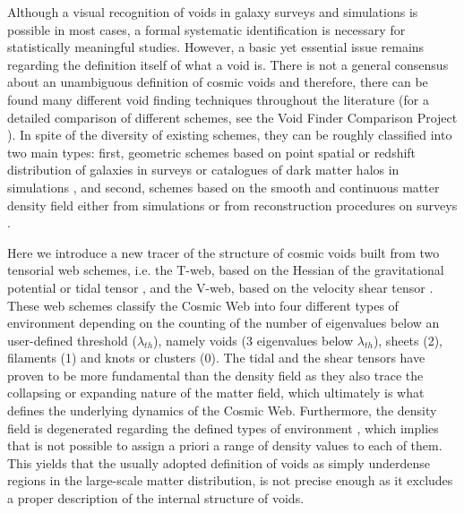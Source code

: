 \documentclass[a4,useAMS,usenatbib,usegraphicx]{latex/mn2e}
\begin{document}
Although a visual recognition of voids in galaxy surveys and simulations
is possible in most cases, a formal systematic identification is necessary 
for statistically meaningful studies. However, a basic yet essential issue 
remains regarding the definition itself of what a void is. There is not a 
general consensus about an unambiguous definition of cosmic voids and 
therefore, there can be found many different void finding techniques 
throughout the literature (for a detailed comparison of different schemes, 
see the Void Finder Comparison Project \citet{Colberg08}). In spite of the 
diversity of existing schemes, they can be roughly classified into two 
main types: first, geometric schemes based on point spatial or redshift 
distribution of galaxies in surveys or catalogues of dark matter halos in 
simulations \citep{Kauffmann91, Muller00, Gottlober03, Hoyle04, Brunino07, 
Foster09, Micheletti14, Sutter14}, and second, schemes based on the smooth 
and continuous matter density field either from simulations or from 
reconstruction procedures on surveys \citep{Plionis02, Colberg05, 
Shandarin06, Platen07, Neyrinck08, Neyrinck13, Ricciardelli2013}.


Here we introduce a new tracer of the structure of cosmic voids built from 
two tensorial web schemes, i.e. the T-web, based on the Hessian of the 
gravitational potential or tidal tensor \citep{Hahn07, Forero09}, and the 
V-web, based on the velocity shear tensor \citep{Hoffman12}. These web 
schemes classify the Cosmic Web into four different types of environment
depending on the counting of the number of eigenvalues below an 
user-defined threshold ($\lambda_{th}$), namely voids (3 eigenvalues below
$\lambda_{th}$), sheets (2), filaments (1) and knots or clusters (0).
The tidal and the shear tensors have proven to be more fundamental than 
the density field as they also trace the collapsing or expanding nature of 
the matter field, which ultimately is what defines the underlying dynamics 
of the Cosmic Web. Furthermore, the density field is degenerated regarding 
the defined types of environment \citep{Hahn07}, which implies that is not 
possible to assign a priori a range of density values to each of them. 
This yields that the usually adopted definition of voids as simply 
underdense regions in the large-scale matter distribution, is not precise 
enough as it excludes a proper description of the internal structure of 
voids.
\end{document}
